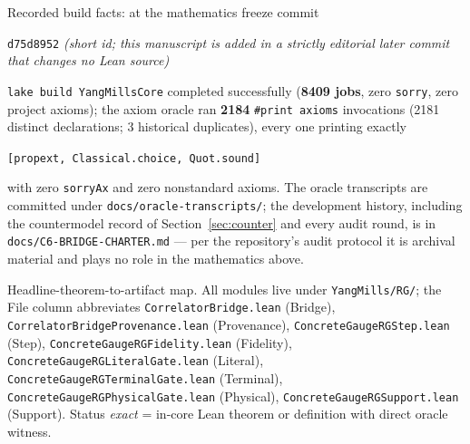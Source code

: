 \documentclass[11pt]{article}
\theoremstyle{definition}
\newcommand{\lean}[1]{\texttt{#1}}
\begin{document}
\medskip
\noindent Recorded build facts: at the mathematics freeze commit
\begin{center}\small
\lean{d75d8952} \emph{(short id; this manuscript is added in a
strictly editorial later commit that changes no Lean source)}
\end{center}
\noindent \lean{lake build YangMillsCore} completed successfully
(\textbf{8409 jobs}, zero \lean{sorry}, zero project axioms); the
axiom oracle ran \textbf{2184} \lean{\#print axioms} invocations
(2181 distinct declarations; 3 historical duplicates), every one
printing exactly
\begin{center}
\lean{[propext, Classical.choice, Quot.sound]}
\end{center}
\noindent with zero \lean{sorryAx} and zero nonstandard axioms.  The
oracle transcripts are committed under
\lean{docs/oracle-transcripts/}; the development history, including
the countermodel record of Section~\ref{sec:counter} and every audit
round, is in \lean{docs/C6-BRIDGE-CHARTER.md} --- per the repository's
audit protocol it is archival material and plays no role in the
mathematics above.

\medskip
\noindent Headline-theorem-to-artifact map.  All modules live under
\lean{YangMills/RG/}; the File column abbreviates
\lean{CorrelatorBridge.lean} (Bridge),
\lean{CorrelatorBridgeProvenance.lean} (Provenance),
\lean{ConcreteGaugeRGStep.lean} (Step),
\lean{ConcreteGaugeRGFidelity.lean} (Fidelity),
\lean{ConcreteGaugeRGLiteralGate.lean} (Literal),
\lean{ConcreteGaugeRGTerminalGate.lean} (Terminal),
\lean{ConcreteGaugeRGPhysicalGate.lean} (Physical),
\lean{ConcreteGaugeRGSupport.lean} (Support).  Status \emph{exact} =
in-core Lean theorem or definition with direct oracle witness.
\end{document}
